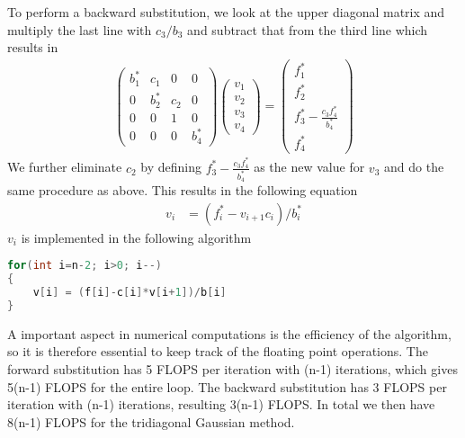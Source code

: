 \documentclass[12pt]{article}
\numberwithin{equation}{section}     %
\begin{document}
To perform a backward substitution, we look at the upper diagonal matrix and multiply the last line with $c_3/b_3$ and subtract that from the third line which results in
\begin{align*}
    \begin{pmatrix}
 b^{*}_1&  c_1&  0& 0\\
 0&  b^{*}_2&  c_2& 0\\
 0&  0&  1& 0\\
 0&  0&  0& b^{*}_4
\end{pmatrix}
\begin{pmatrix}
v_1\\
v_2\\
v_3\\
v_4
\end{pmatrix}
=
\begin{pmatrix}
f^{*}_1\\
f^{*}_2\\
f^{*}_3-\frac{c_3f^{*}_4}{b^{*}_4}\\
f^{*}_4
\end{pmatrix}
\end{align*}
We further eliminate $c_2$ by defining $f^{*}_3-\frac{c_3f^{*}_4}{b^{*}_{4}}$ as the new value for $v_3$ and do the same procedure as above. This results in the following equation
\begin{align*}
    v_{i}&=(f^{*}_i-v_{i+1}c_i)/b^{*}_i
\end{align*}
$v_i$ is implemented in the following algorithm
\begin{lstlisting}[language=c++]
for(int i=n-2; i>0; i--)
{
    v[i] = (f[i]-c[i]*v[i+1])/b[i]
}
\end{lstlisting}
A important aspect in numerical computations is the efficiency of the algorithm, so it is therefore essential to keep track of the floating point operations. The forward substitution has 5 FLOPS per iteration with (n-1) iterations, which gives 5(n-1) FLOPS for the entire loop. The backward substitution has 3 FLOPS per iteration with (n-1) iterations, resulting 3(n-1) FLOPS. In total we then have 8(n-1) FLOPS for the tridiagonal Gaussian method.
\end{document}
